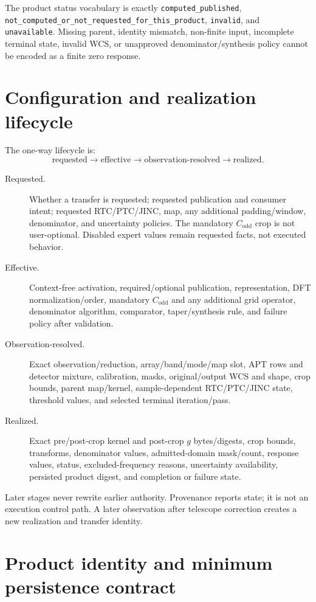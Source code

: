 \documentclass[11pt]{article}
\begin{document}
The product status vocabulary is exactly
\texttt{computed\_published},
\texttt{not\_computed\_or\_not\_requested\_for\_this\_product},
\texttt{invalid}, and \texttt{unavailable}.  Missing parent, identity mismatch,
non-finite input, incomplete terminal state, invalid WCS, or unapproved
denominator/synthesis policy cannot be encoded as a finite zero response.

\section{Configuration and realization lifecycle}

The one-way lifecycle is:
\[
 \text{requested}\rightarrow\text{effective}\rightarrow
 \text{observation-resolved}\rightarrow\text{realized}.
\]

\begin{description}
\item[Requested.] Whether a transfer is requested; requested publication and
consumer intent; requested RTC/PTC/JINC, map, any additional padding/window,
denominator, and uncertainty policies.  The mandatory $C_{\mathrm{odd}}$ crop
is not user-optional.  Disabled expert values remain requested facts, not
executed behavior.
\item[Effective.] Context-free activation, required/optional publication,
representation, DFT normalization/order, mandatory $C_{\mathrm{odd}}$ and any
additional grid operator, denominator algorithm, comparator, taper/synthesis
rule, and failure policy after validation.
\item[Observation-resolved.] Exact observation/reduction, array/band/mode/map
slot, APT rows and detector mixture, calibration, masks, original/output
WCS and shape, crop bounds, parent map/kernel, sample-dependent RTC/PTC/JINC
state, threshold values, and selected terminal iteration/pass.
\item[Realized.] Exact pre/post-crop kernel and post-crop $g$ bytes/digests,
crop bounds, transforms, denominator values, admitted-domain mask/count,
response values, status, excluded-frequency reasons, uncertainty availability,
persisted product digest, and completion or failure state.
\end{description}

Later stages never rewrite earlier authority.  Provenance reports state; it is
not an execution control path.  A later observation after telescope correction
creates a new realization and transfer identity.

\section{Product identity and minimum persistence contract}
\end{document}
